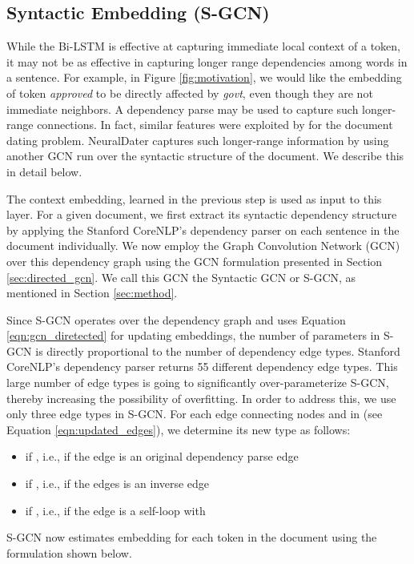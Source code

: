 \documentclass[11pt,a4paper]{article}
\newcommand{\refeqn}[1]{Equation \ref{#1}}
\newcommand{\reffig}[1]{Figure \ref{#1}}
\newcommand{\refsec}[1]{Section \ref{#1}}
\newcommand{\method}{NeuralDater}
\begin{document}
\subsection{Syntactic Embedding (S-GCN)} 
\label{sec:syntax_gcn}

While the Bi-LSTM is effective at capturing immediate local context of a token, it may not be as effective in capturing longer range dependencies among words in a sentence. For example, in \reffig{fig:motivation}, we would like the embedding of token \textit{approved} to be directly affected by \textit{govt}, even though they are not immediate neighbors. A dependency parse may be used to capture such longer-range connections. In fact, similar features were exploited by \cite{Chambers:2012:LDT:2390524.2390539} for the document dating problem. \method{} captures such longer-range information by using another GCN run over the syntactic structure of the document. We describe this in detail below.

The context embedding,  learned in the previous step is used as input to this layer. For a given document, we first extract its syntactic dependency structure by applying the Stanford CoreNLP's dependency parser \cite{stanford_corenlp} on each sentence in the document individually. We now employ the Graph Convolution Network (GCN) over this dependency graph using the GCN formulation presented in \refsec{sec:directed_gcn}. We call this GCN the Syntactic GCN or S-GCN, as mentioned in \refsec{sec:method}.

Since S-GCN operates over the dependency graph and uses \refeqn{eqn:gcn_diretected} for updating embeddings, the number of parameters in S-GCN is directly proportional to the number of dependency edge types. Stanford CoreNLP's dependency parser returns 55 different dependency edge types. This large number of edge types is going to significantly over-parameterize S-GCN, thereby increasing the possibility of overfitting. In order to address this, we use only three edge types in S-GCN. For each edge connecting nodes  and  in  (see \refeqn{eqn:updated_edges}), we determine its new type  as follows:
\begin{itemize}
	\item  if , i.e., if the edge is an original dependency parse edge
	\item  if , i.e., if the edges is an inverse edge	
	\item  if , i.e., if the edge is a self-loop with 
\end{itemize}
S-GCN now estimates embedding  for each token  in the document using the formulation shown below.
\end{document}

